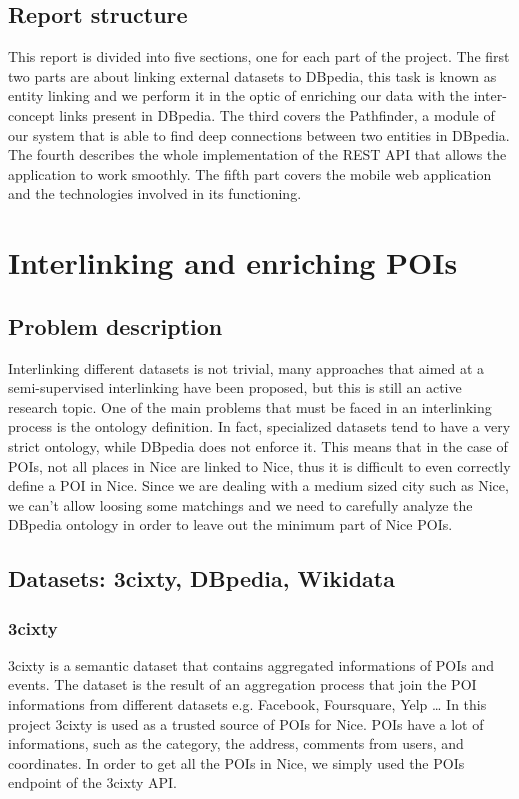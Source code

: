\documentclass[paper=a4, fontsize=11pt]{scrartcl}
\begin{document}
\subsection{Report structure}
This report is divided into five sections, one for each part of the project. The first two parts are about linking external datasets to DBpedia, this task is known as entity linking and we perform it in the optic of enriching our data with the inter-concept links present in DBpedia.
The third covers the Pathfinder, a module of our system that is able to find deep connections between two entities in DBpedia.
The fourth describes the whole implementation of the REST API that allows the application to work smoothly.
The fifth part covers the mobile web application and the technologies involved in its functioning.

\section{Interlinking and enriching POIs}
\subsection{Problem description}
Interlinking different datasets is not trivial, many approaches that aimed at a semi-supervised interlinking have been proposed, but this is still an active research topic.
One of the main problems that must be faced in an interlinking process is the ontology definition. In fact, specialized datasets tend to have a very strict ontology, while DBpedia does not enforce it. This means that in the case of POIs, not all places in Nice are linked to Nice, thus it is difficult to even correctly define a POI in Nice.
Since we are dealing with a medium sized city such as Nice, we can't allow loosing some matchings and we need to carefully analyze the DBpedia ontology in order to leave out the minimum part of Nice POIs.

\subsection{Datasets: 3cixty, DBpedia, Wikidata}
\subsubsection{3cixty}
3cixty is a semantic dataset that contains aggregated informations of POIs and events. The dataset is the result of an aggregation process that join the POI informations from different datasets e.g. Facebook, Foursquare, Yelp \dots
In this project 3cixty is used as a trusted source of POIs for Nice.
POIs have a lot of informations, such as the category, the address, comments from users, and coordinates. In order to get all the POIs in Nice, we simply used the POIs endpoint of the 3cixty API.
\end{document}
